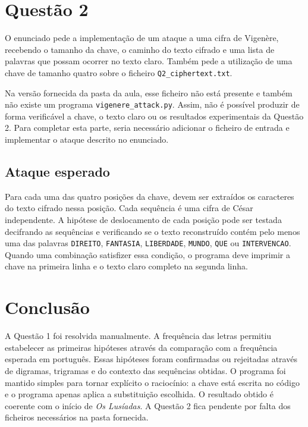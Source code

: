 \documentclass[11pt,a4paper]{article}
\begin{document}
\section*{Questão 2}

O enunciado pede a implementação de um ataque a uma cifra de Vigenère,
recebendo o tamanho da chave, o caminho do texto cifrado e uma lista de palavras
que possam ocorrer no texto claro. Também pede a utilização de uma chave de
tamanho quatro sobre o ficheiro \texttt{Q2\_ciphertext.txt}.

Na versão fornecida da pasta da aula, esse ficheiro não está presente e também
não existe um programa \texttt{vigenere\_attack.py}. Assim, não é possível
produzir de forma verificável a chave, o texto claro ou os resultados
experimentais da Questão 2. Para completar esta parte, seria necessário
adicionar o ficheiro de entrada e implementar o ataque descrito no enunciado.

\subsection*{Ataque esperado}

Para cada uma das quatro posições da chave, devem ser extraídos os caracteres
do texto cifrado nessa posição. Cada sequência é uma cifra de César
independente. A hipótese de deslocamento de cada posição pode ser testada
decifrando as sequências e verificando se o texto reconstruído contém pelo
menos uma das palavras \texttt{DIREITO}, \texttt{FANTASIA},
\texttt{LIBERDADE}, \texttt{MUNDO}, \texttt{QUE} ou
\texttt{INTERVENCAO}. Quando uma combinação satisfizer essa condição, o
programa deve imprimir a chave na primeira linha e o texto claro completo na
segunda linha.

\section*{Conclusão}

A Questão 1 foi resolvida manualmente. A frequência das letras permitiu
estabelecer as primeiras hipóteses através da comparação com a frequência
esperada em português. Essas hipóteses foram confirmadas ou rejeitadas através
de digramas, trigramas e do contexto das sequências obtidas. O programa foi
mantido simples para tornar explícito o raciocínio: a chave está escrita no
código e o programa apenas aplica a substituição escolhida. O resultado obtido
é coerente com o início de \textit{Os Lusíadas}. A Questão 2 fica pendente por
falta dos ficheiros necessários na pasta fornecida.
\end{document}
